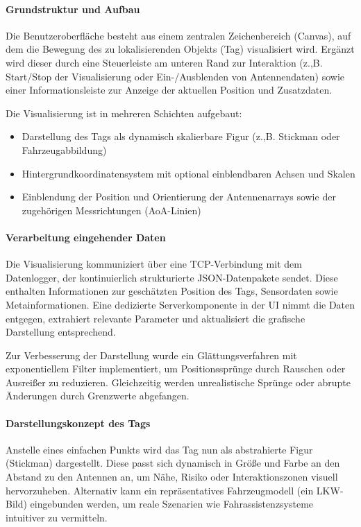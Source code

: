 \documentclass[a4paper, 12pt]{article} %
\begin{document}
\paragraph{Grundstruktur und Aufbau}

Die Benutzeroberfläche besteht aus einem zentralen Zeichenbereich (Canvas), auf dem die Bewegung des zu lokalisierenden Objekts (Tag) visualisiert wird. 
Ergänzt wird dieser durch eine Steuerleiste am unteren Rand zur Interaktion (z.,B. Start/Stop der Visualisierung oder Ein-/Ausblenden von Antennendaten) 
sowie einer Informationsleiste zur Anzeige der aktuellen Position und Zusatzdaten.

Die Visualisierung ist in mehreren Schichten aufgebaut:
\begin{itemize}
\item Darstellung des Tags als dynamisch skalierbare Figur (z.,B. Stickman oder Fahrzeugabbildung)
\item Hintergrundkoordinatensystem mit optional einblendbaren Achsen und Skalen
\item Einblendung der Position und Orientierung der Antennenarrays sowie der zugehörigen Messrichtungen (\ac{AoA}-Linien)
\end{itemize}

\paragraph{Verarbeitung eingehender Daten}

Die Visualisierung kommuniziert über eine TCP-Verbindung mit dem Datenlogger, der kontinuierlich strukturierte \ac{JSON}-Datenpakete sendet. Diese enthalten 
Informationen zur geschätzten Position des Tags, Sensordaten sowie Metainformationen. Eine dedizierte Serverkomponente in der \ac{UI} nimmt die Daten entgegen,
 extrahiert relevante Parameter und aktualisiert die grafische Darstellung entsprechend.

Zur Verbesserung der Darstellung wurde ein Glättungsverfahren mit exponentiellem Filter implementiert, um Positionssprünge durch Rauschen oder Ausreißer 
zu reduzieren. Gleichzeitig werden unrealistische Sprünge oder abrupte Änderungen durch Grenzwerte abgefangen.

\paragraph{Darstellungskonzept des Tags}

Anstelle eines einfachen Punkts wird das Tag nun als abstrahierte Figur (Stickman) dargestellt. Diese passt sich dynamisch in Größe und Farbe an
 den Abstand zu den Antennen an, um Nähe, Risiko oder Interaktionszonen visuell hervorzuheben. Alternativ kann ein repräsentatives Fahrzeugmodell 
 (ein \ac{LKW}-Bild) eingebunden werden, um reale Szenarien wie Fahrassistenzsysteme intuitiver zu vermitteln.
\end{document}
